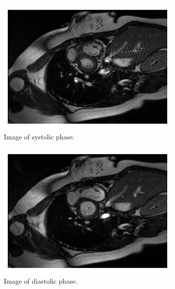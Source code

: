 \begin{figure}[h]%
	\centering
	\begin{subfigure}{0.45\textwidth}
    		\includegraphics[width=\textwidth]{./Images/Image_ACDC_systolic.png}
    		\caption{Image of systolic phase.}
    		\label{fig:Image_ACDC_systolic}
	\end{subfigure}
	\hfill
	\begin{subfigure}{0.45\textwidth}
    		\includegraphics[width=\textwidth]{./Images/Image_ACDC_diastolic.png}
    		\caption{Image of diastolic phase.}
    		\label{fig:Image_ACDC_diastolic}
	\end{subfigure} 
	\\
	\begin{subfigure}{0.45\textwidth}

\end{subfigure}
\end{figure}
